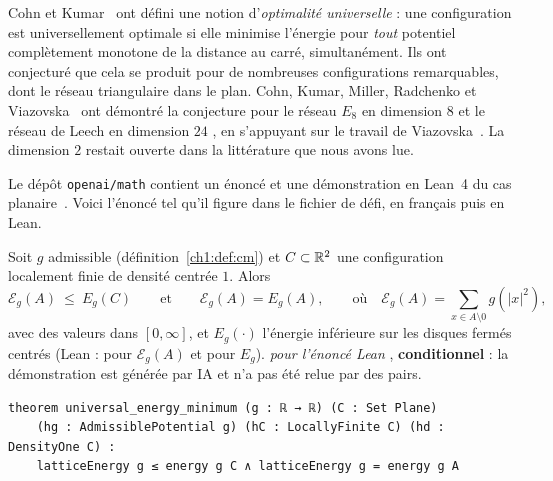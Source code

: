 Cohn et Kumar~\cite{ck} ont défini une notion d'\emph{optimalité universelle} : une configuration est universellement optimale si elle minimise l'énergie pour
\emph{tout} potentiel complètement monotone de la distance au carré, simultanément. Ils ont conjecturé que cela se produit pour de nombreuses configurations
remarquables, dont le réseau triangulaire dans le plan. Cohn, Kumar, Miller, Radchenko et Viazovska~\cite{ckmrv} ont démontré la conjecture pour le réseau $E_8$ en dimension $8$ et le réseau de Leech
en dimension $24$ \tierL{}, en s'appuyant sur le travail de Viazovska~\cite{viazovska}. La dimension $2$ restait ouverte dans la littérature que nous avons lue.

Le dépôt \texttt{openai/math} contient un énoncé et une démonstration en Lean~4 du cas planaire~\cite{oai}. Voici l'énoncé tel qu'il figure dans le fichier de
défi, en français puis en Lean.

\begin{theorem}\label{ch1:thm:univ}
Soit $g$ admissible (définition~\ref{ch1:def:cm}) et $C\subset\mathbb{R}^2$ une configuration localement finie de densité centrée $1$. Alors
\[
  \mathcal E_g(A)\ \le\ E_g(C)\qquad\text{et}\qquad \mathcal E_g(A)=E_g(A),\qquad\text{où}\quad \mathcal E_g(A)=\sum_{x\in A\setminus 0}g(|x|^2),
\]
avec des valeurs dans $[0,\infty]$, et $E_g(\cdot)$ l'énergie inférieure sur les disques fermés centrés (Lean :  pour $\mathcal E_g(A)$ et  pour $E_g$). \tierA{} \emph{pour l'énoncé Lean}
, \textbf{conditionnel} : la démonstration est générée par IA et n'a pas été relue par des pairs.
\end{theorem}

\begin{leanbox}
\begin{lstlisting}[language=Lean]
theorem universal_energy_minimum (g : ℝ → ℝ) (C : Set Plane)
    (hg : AdmissiblePotential g) (hC : LocallyFinite C) (hd : DensityOne C) :
    latticeEnergy g ≤ energy g C ∧ latticeEnergy g = energy g A
\end{lstlisting}
\end{leanbox}

